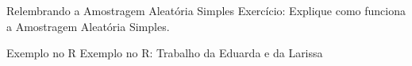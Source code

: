 


    

\begin{frame}{Relembrando a Amostragem Aleatória Simples}
 Exercício: Explique como funciona a Amostragem Aleatória Simples.
\end{frame}

\begin{frame}{Exemplo no R}
    Exemplo no R: Trabalho da Eduarda e da Larissa
\end{frame}

